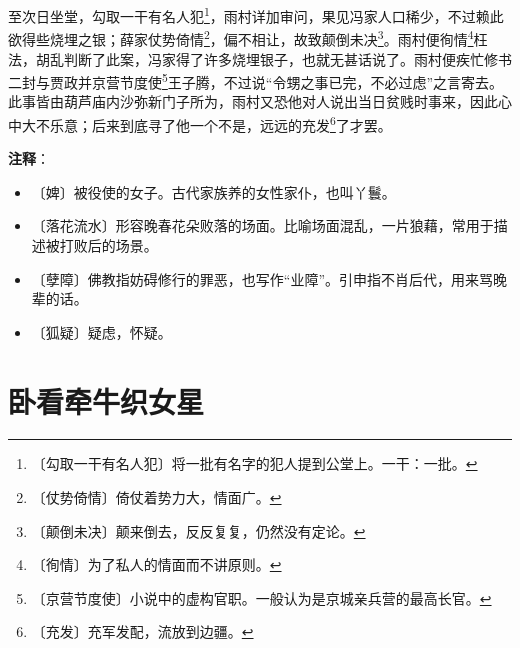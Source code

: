 \documentclass[12pt,UTF-8,openany]{ctexbook}
\begin{document}
\begin{normalsize}
    至次日坐堂，勾取一干有名人犯\footnote{〔勾取一干有名人犯〕将一批有名字的犯人提到公堂上。一干：一批。}，雨村详加审问，果见冯家人口稀少，不过赖此欲得些烧埋之银；薛家仗势倚情\footnote{〔仗势倚情〕倚仗着势力大，情面广。}，偏不相让，故致颠倒未决\footnote{〔颠倒未决〕颠来倒去，反反复复，仍然没有定论。}。雨村便徇情\footnote{〔徇情〕为了私人的情面而不讲原则。}枉法，胡乱判断了此案，冯家得了许多烧埋银子，也就无甚话说了。雨村便疾忙修书二封与贾政并京营节度使\footnote{〔京营节度使〕小说中的虚构官职。一般认为是京城亲兵营的最高长官。}王子腾，不过说“令甥之事已完，不必过虑”之言寄去。此事皆由葫芦庙内沙弥新门子所为，雨村又恐他对人说出当日贫贱时事来，因此心中大不乐意；后来到底寻了他一个不是，远远的充发\footnote{〔充发〕充军发配，流放到边疆。}了才罢。
    
\end{normalsize}


\newpage

\textbf{注释}：

\vspace{-1em}

\begin{itemize}
    \setlength\itemsep{-0.2em}
    \item 〔婢〕被役使的女子。古代家族养的女性家仆，也叫丫鬟。
    \item 〔落花流水〕形容晚春花朵败落的场面。比喻场面混乱，一片狼藉，常用于描述被打败后的场景。
    \item 〔孽障〕佛教指妨碍修行的罪恶，也写作“业障”。引申指不肖后代，用来骂晚辈的话。
    \item 〔狐疑〕疑虑，怀疑。
\end{itemize}

\chapter{卧看牵牛织女星}
\end{document}
